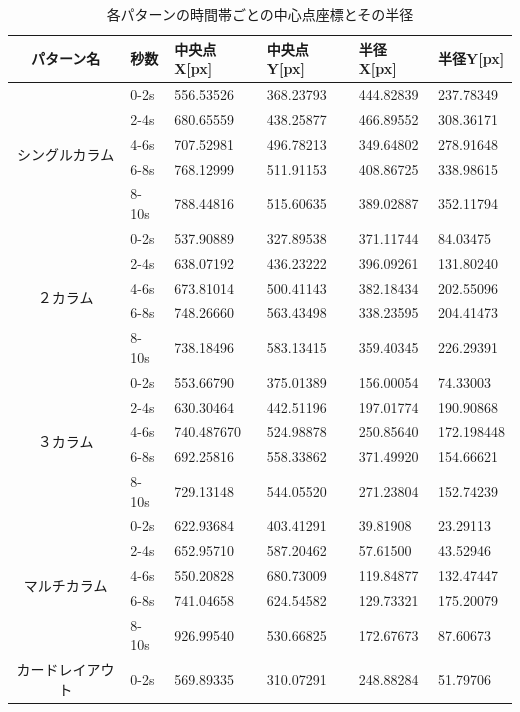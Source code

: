\begin{table}[h]
  \caption{各パターンの時間帯ごとの中心点座標とその半径}
  \label{table:layoutresult}
  \footnotesize
  \centering
    \begin{tabular}{clllll}
    \hline
    パターン名 & 秒数 & 中央点X[px] & 中央点Y[px] & 半径X[px] & 半径Y[px] \\
    \hline \hline
    \multirow{5}{*}{シングルカラム} & 0-2s & 556.53526 & 368.23793 & 444.82839 & 237.78349 \\
    & 2-4s & 680.65559 & 438.25877 & 466.89552 & 308.36171 \\
    & 4-6s & 707.52981 & 496.78213 & 349.64802 & 278.91648 \\
    & 6-8s & 768.12999 & 511.91153 & 408.86725 & 338.98615 \\
    & 8-10s & 788.44816 & 515.60635 & 389.02887 & 352.11794 \\
    \hline
    \multirow{5}{*}{２カラム} & 0-2s & 537.90889 & 327.89538 & 371.11744 & 84.03475 \\
    & 2-4s & 638.07192 & 436.23222 & 396.09261 & 131.80240 \\
    & 4-6s & 673.81014 & 500.41143 & 382.18434 & 202.55096 \\
    & 6-8s & 748.26660 & 563.43498 & 338.23595 & 204.41473 \\
    & 8-10s & 738.18496 & 583.13415 & 359.40345 & 226.29391 \\
    \hline
    \multirow{5}{*}{３カラム} & 0-2s & 553.66790 & 375.01389 & 156.00054 & 74.33003 \\
    & 2-4s & 630.30464 & 442.51196 & 197.01774 & 190.90868 \\
    & 4-6s & 740.487670 & 524.98878 & 250.85640 & 172.198448 \\
    & 6-8s & 692.25816 & 558.33862 & 371.49920 & 154.66621 \\
    & 8-10s & 729.13148 & 544.05520 & 271.23804 & 152.74239 \\
    \hline
    \multirow{5}{*}{マルチカラム} & 0-2s & 622.93684 & 403.41291 & 39.81908 & 23.29113 \\
    & 2-4s & 652.95710 & 587.20462 & 57.61500 & 43.52946 \\
    & 4-6s & 550.20828 & 680.73009 & 119.84877 & 132.47447 \\
    & 6-8s & 741.04658 & 624.54582 & 129.73321 & 175.20079 \\
    & 8-10s & 926.99540 & 530.66825 & 172.67673 & 87.60673 \\
    \hline
    \multirow{5}{*}{カードレイアウト} & 0-2s & 569.89335 & 310.07291 & 248.88284 & 51.79706 \\

\end{tabular}
\end{table}
